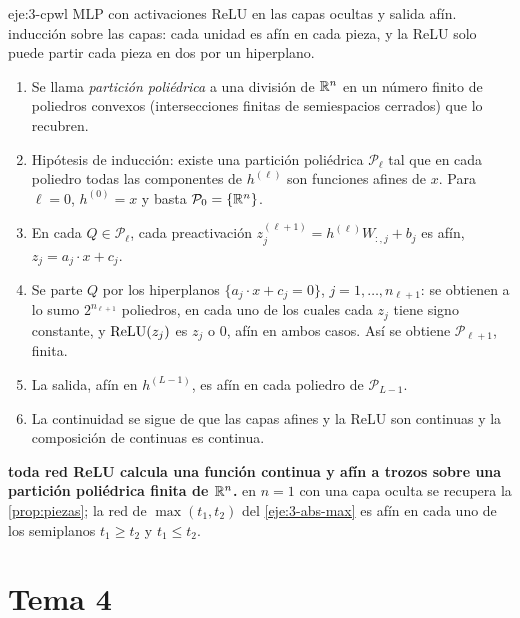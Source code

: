 \begin{solucion}{eje:3-cpwl}
\datos MLP con activaciones ReLU en las capas ocultas y salida afín.
\planteamiento inducción sobre las capas: cada unidad es afín en cada pieza, y la ReLU solo puede partir cada pieza en dos por un hiperplano.
\pasos
\begin{enumerate}[label=\arabic*.]
  \item Se llama \emph{partición poliédrica} a una división de $\mathbb{R}^{n}$ en un número finito de poliedros convexos (intersecciones finitas de semiespacios cerrados) que lo recubren.
  \item Hipótesis de inducción: existe una partición poliédrica $\mathcal{P}_\ell$ tal que en cada poliedro todas las componentes de $h^{(\ell)}$ son funciones afines de $x$. Para $\ell=0$, $h^{(0)}=x$ y basta $\mathcal{P}_0=\{\mathbb{R}^{n}\}$.
  \item En cada $Q\in\mathcal{P}_\ell$, cada preactivación $z^{(\ell+1)}_j=h^{(\ell)}W_{:,j}+b_j$ es afín, $z_j=a_j\cdot x+c_j$.
  \item Se parte $Q$ por los hiperplanos $\{a_j\cdot x+c_j=0\}$, $j=1,\dots,n_{\ell+1}$: se obtienen a lo sumo $2^{n_{\ell+1}}$ poliedros, en cada uno de los cuales cada $z_j$ tiene signo constante, y $\operatorname{ReLU}(z_j)$ es $z_j$ o $0$, afín en ambos casos. Así se obtiene $\mathcal{P}_{\ell+1}$, finita.
  \item La salida, afín en $h^{(L-1)}$, es afín en cada poliedro de $\mathcal{P}_{L-1}$.
  \item La continuidad se sigue de que las capas afines y la ReLU son continuas y la composición de continuas es continua.
\end{enumerate}
\resultado \textbf{toda red ReLU calcula una función continua y afín a trozos sobre una partición poliédrica finita de $\mathbb{R}^{n}$.}
\comprobacion en $n=1$ con una capa oculta se recupera la \cref{prop:piezas}; la red de $\max(t_1,t_2)$ del \cref{eje:3-abs-max} es afín en cada uno de los semiplanos $t_1\ge t_2$ y $t_1\le t_2$.
\end{solucion}

\section{Tema 4}


